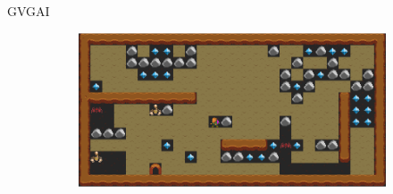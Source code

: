 \documentclass[11pt]{beamer}    %
\begin{document}
\begin{frame}{GVGAI}
\begin{figure}
\begin{subfigure}[t]{.5\textwidth}
            \end{subfigure}%
            \begin{subfigure}[t]{.5\textwidth}
                \centering
                \includegraphics[scale=0.2]{img/presentation/boulderdash}
            \end{subfigure}
        \end{figure}
    \end{frame}
\end{document}
